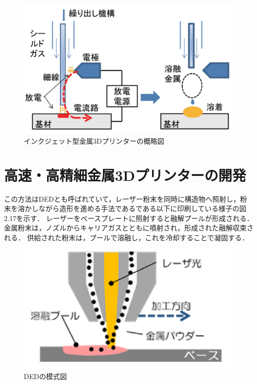 \begin{figure}[H]
  \centering
  \includegraphics[width=10truecm]{./fig/houdenn.png}
  \caption{インクジェット型金属3Dプリンターの概略図}
  \label{fig:ferret}
\end{figure}



\section{高速・高精細金属3Dプリンターの開発\cite{k}}
\label{sec:enum}
この方法はDEDとも呼ばれていて，レーザー粉末を同時に構造物へ照射し，粉末を溶かしながら造形を進める手法であるである以下に印刷している様子の図2.17を示す．
レーザーをベースプレートに照射すると融解プールが形成される．金属粉末は，ノズルからキャリアガスとともに噴射され，形成された融解収束される．
供給された粉末は，プールで溶融し，これを冷却することで凝固する．

\begin{figure}[H]
  \centering
  \includegraphics[width=9truecm]{./fig/kinnzoku.png}
  \caption{DEDの模式図}
  \label{fig:ferret}
\end{figure}

